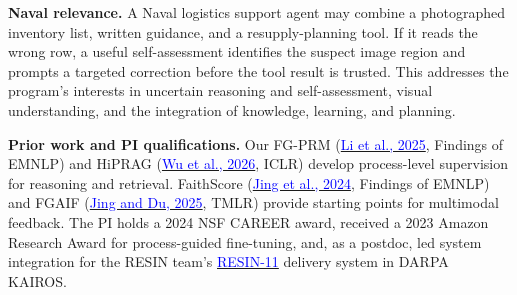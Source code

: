 \documentclass[11pt,letterpaper]{article}
\newcommand{\head}[1]{\textbf{#1}\enspace}
\begin{document}
\par\head{Naval relevance.} A Naval logistics support agent may combine a photographed inventory list, written guidance, and a resupply-planning tool. If it reads the wrong row, a useful self-assessment identifies the suspect image region and prompts a targeted correction before the tool result is trusted. This addresses the program's interests in uncertain reasoning and self-assessment, visual understanding, and the integration of knowledge, learning, and planning.
\par\head{Prior work and PI qualifications.} Our FG-PRM (\href{https://doi.org/10.18653/v1/2025.findings-emnlp.228}{\textcolor{blue}{Li et al., 2025}}, Findings of EMNLP) and HiPRAG (\href{https://arxiv.org/abs/2510.07794}{\textcolor{blue}{Wu et al., 2026}}, ICLR) develop process-level supervision for reasoning and retrieval. FaithScore (\href{https://aclanthology.org/2024.findings-emnlp.290/}{\textcolor{blue}{Jing et al., 2024}}, Findings of EMNLP) and FGAIF (\href{https://openreview.net/forum?id=Qhfw5CUVd7}{\textcolor{blue}{Jing and Du, 2025}}, TMLR) provide starting points for multimodal feedback. The PI holds a 2024 NSF CAREER award, received a 2023 Amazon Research Award for process-guided fine-tuning, and, as a postdoc, led system integration for the RESIN team's \href{https://doi.org/10.18653/v1/2022.naacl-demo.7}{\textcolor{blue}{RESIN-11}} delivery system in DARPA KAIROS.
\end{document}
